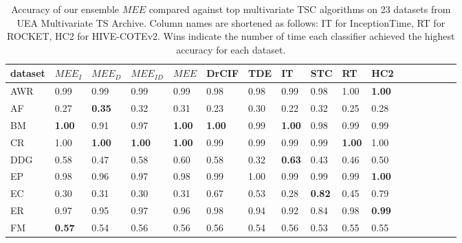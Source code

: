 \begin{table}
\centering
\caption{Accuracy of our ensemble $MEE$ compared against top multivariate TSC algorithms on 23 datasets from UEA Multivariate TS Archive.                   Column names are shortened as follows: IT for InceptionTime, RT for ROCKET, HC2 for HIVE-COTEv2.                   Wins indicate the number of time each classifier achieved the highest accuracy for each dataset.}
\label{tbl:acc-ee}
\begin{tabular}{p{0.6cm}*{16}{p{0.45cm}}}
\toprule
dataset &     $MEE_{I}$ &     $MEE_{D}$ &    $MEE_{ID}$ &         $MEE$ &         DrCIF &           TDE &            IT &           STC &            RT &           HC2 \\
\midrule
    AWR &          0.99 &          0.99 &          0.99 &          0.99 &          0.98 &          0.98 &          0.99 &          0.98 &          1.00 & \textbf{1.00} \\
     AF &          0.27 & \textbf{0.35} &          0.32 &          0.31 &          0.23 &          0.30 &          0.22 &          0.32 &          0.25 &          0.28 \\
     BM & \textbf{1.00} &          0.91 &          0.97 & \textbf{1.00} & \textbf{1.00} &          0.99 & \textbf{1.00} &          0.98 &          0.99 &          0.99 \\
     CR &          1.00 & \textbf{1.00} & \textbf{1.00} & \textbf{1.00} &          0.99 &          0.99 &          0.99 &          0.99 & \textbf{1.00} &          1.00 \\
    DDG &          0.58 &          0.47 &          0.58 &          0.60 &          0.58 &          0.32 & \textbf{0.63} &          0.43 &          0.46 &          0.50 \\
     EP &          0.98 &          0.96 &          0.97 &          0.98 &          0.99 &          1.00 &          0.99 &          0.99 &          0.99 & \textbf{1.00} \\
     EC &          0.30 &          0.31 &          0.30 &          0.31 &          0.67 &          0.53 &          0.28 & \textbf{0.82} &          0.45 &          0.79 \\
     ER &          0.97 &          0.95 &          0.97 &          0.96 &          0.98 &          0.94 &          0.92 &          0.84 &          0.98 & \textbf{0.99} \\
     FM & \textbf{0.57} &          0.54 &          0.56 &          0.56 &          0.56 &          0.54 &          0.56 &          0.53 &          0.55 &          0.55 \\

\end{tabular}
\end{table}
